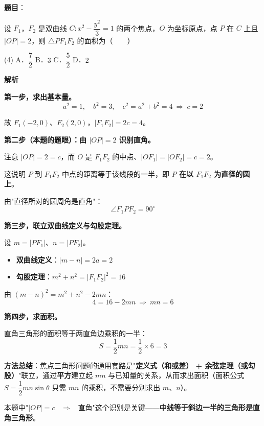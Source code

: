 \begin{answer}

\textbf{题目}：

设 $F_1$，$F_2$ 是双曲线 $C:x^{2}-\dfrac{y^{2}}3=1$ 的两个焦点，$O$ 为坐标原点，点 $P$ 在 $C$ 上且 $|OP|=2$，则 $\triangle PF_1F_2$ 的面积为\mbox{（　　）}

\begin{gkopts}(4)
\task A．$\dfrac72$
\task B．$3$
\task C．$\dfrac52$
\task D．$2$
\end{gkopts}

\textbf{解析}

\textbf{第一步，求出基本量。}
\nopagebreak[4]
\[a^{2}=1,\quad b^{2}=3,\quad c^{2}=a^{2}+b^{2}=4\ \Longrightarrow\ c=2\]

故 $F_1(-2,0)$、$F_2(2,0)$，$\left|F_1F_2\right|=2c=4$。

\textbf{第二步（本题的题眼）：由 $|OP|=2$ 识别直角。}

注意 $|OP|=2=c$，而 $O$ 是 $F_1F_2$ 的中点、$\left|OF_1\right|=\left|OF_2\right|=c=2$。

这说明 $P$ 到 $F_1F_2$ 中点的距离等于该线段的一半，即 \textbf{$P$ 在以 $F_1F_2$ 为直径的圆上}。

由"直径所对的圆周角是直角"：
\nopagebreak[4]
\[\angle F_1PF_2=90^\circ\]

\textbf{第三步，联立双曲线定义与勾股定理。}

设 $m=\left|PF_1\right|$、$n=\left|PF_2\right|$。

\begin{itemize}
\item \textbf{双曲线定义}：$|m-n|=2a=2$
\item \textbf{勾股定理}：$m^{2}+n^{2}=\left|F_1F_2\right|^{2}=16$
\end{itemize}

由 $(m-n)^{2}=m^{2}+n^{2}-2mn$：
\nopagebreak[4]
\[4=16-2mn\ \Longrightarrow\ mn=6\]

\textbf{第四步，求面积。}

直角三角形的面积等于两直角边乘积的一半：
\nopagebreak[4]
\[S=\frac12mn=\frac12\times6=3\]

\begin{gktip}
\textbf{方法总结}：焦点三角形问题的通用套路是"\textbf{定义式（和或差） + 余弦定理（或勾股）}"联立，通过\textbf{平方}建立起 $mn$ 与已知量的关系，从而求出面积（面积公式 $S=\dfrac12mn\sin\theta$ 只需 $mn$ 的乘积，不需要分别求出 $m$、$n$）。

本题中"$|OP|=c$ ~$\Longrightarrow$~ 直角"这个识别是关键——\textbf{中线等于斜边一半的三角形是直角三角形}。
\end{gktip}


\par\medskip

\end{answer}
